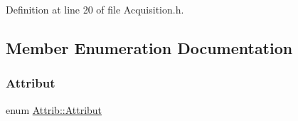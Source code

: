 Definition at line 20 of file Acquisition.\+h.



\subsection{Member Enumeration Documentation}
\mbox{\label{classAttrib_a69e171d7cc6417835a5a306d3c764235}} 
\subsubsection{\texorpdfstring{Attribut}{Attribut}}
{\footnotesize\ttfamily enum \hyperlink{classAttrib_a69e171d7cc6417835a5a306d3c764235}{Attrib\+::\+Attribut}\hspace{0.3cm}{\ttfamily [inherited]}}


